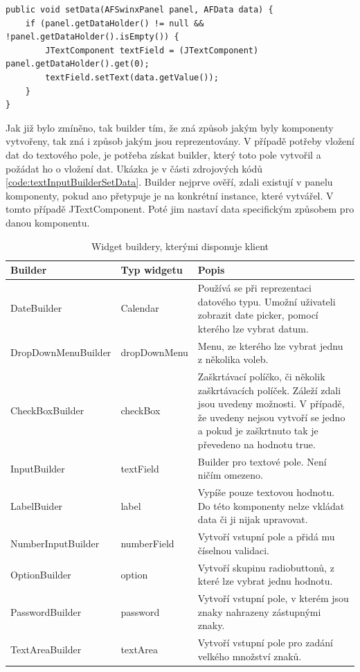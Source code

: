 \begin{lstlisting}[caption={Vložení dat do vstupního pole vytvořeného builderem.},
  label={code:textInputBuilderSetData}]
public void setData(AFSwinxPanel panel, AFData data) {
	if (panel.getDataHolder() != null && !panel.getDataHolder().isEmpty()) {
		JTextComponent textField = (JTextComponent) panel.getDataHolder().get(0);
		textField.setText(data.getValue());
	}
}
\end{lstlisting}

Jak již bylo zmíněno, tak builder tím, že zná způsob jakým byly komponenty vytvořeny, tak zná i způsob jakým jsou reprezentovány. V případě potřeby vložení dat do textového pole, je potřeba získat builder, který toto pole vytvořil a požádat ho o vložení dat. Ukázka je v části zdrojových kódů \ref{code:textInputBuilderSetData}. Builder nejprve ověří, zdali existují v panelu komponenty, pokud ano přetypuje je na konkrétní instance, které vytvářel. V tomto případě JTextComponent. Poté jim nastaví data specifickým způsobem pro danou komponentu.


\begin{table}[width=\linewidth]
\begin{center}
\caption{Widget buildery, kterými disponuje klient}
\label{table:widgetBuilders}
\begin{tabular}{|p{4cm}|p{3cm}|p{7cm}|}
\hline
\textbf{Builder} & \textbf{Typ widgetu} & \textbf{Popis} \\
\hline
DateBuilder & 
Calendar & Používá se při reprezentaci datového typu. Umožní uživateli zobrazit date picker, pomocí kterého lze vybrat datum.\\
\hline
DropDownMenuBuilder &
dropDownMenu & Menu, ze kterého lze vybrat jednu z několika voleb.\\
\hline
CheckBoxBuilder & checkBox &
Zaškrtávací políčko, či několik zaškrtávacích políček. Záleží zdali jsou uvedeny možnosti. V případě, že uvedeny nejsou vytvoří se jedno a pokud je zaškrtnuto tak je převedeno na hodnotu true.\\
\hline
InputBuilder & textField &
Builder pro textové pole. Není ničím omezeno.\\
\hline
LabelBuider & label &
Vypíše pouze textovou hodnotu. Do této komponenty nelze vkládat data či ji nijak upravovat. \\
\hline
NumberInputBuilder & numberField	 &
Vytvoří vstupní pole a přidá mu číselnou validaci. \\
\hline
OptionBuilder & option &
Vytvoří skupinu radiobuttonů, z které lze vybrat jednu hodnotu. \\
\hline
PasswordBuilder & password &
Vytvoří vstupní pole, v kterém jsou znaky nahrazeny zástupnými znaky. \\
\hline
TextAreaBuilder & textArea &
Vytvoří vstupní pole pro zadání velkého množství znaků. \\
\hline
\end{tabular}
\end{center}
\end{table}


